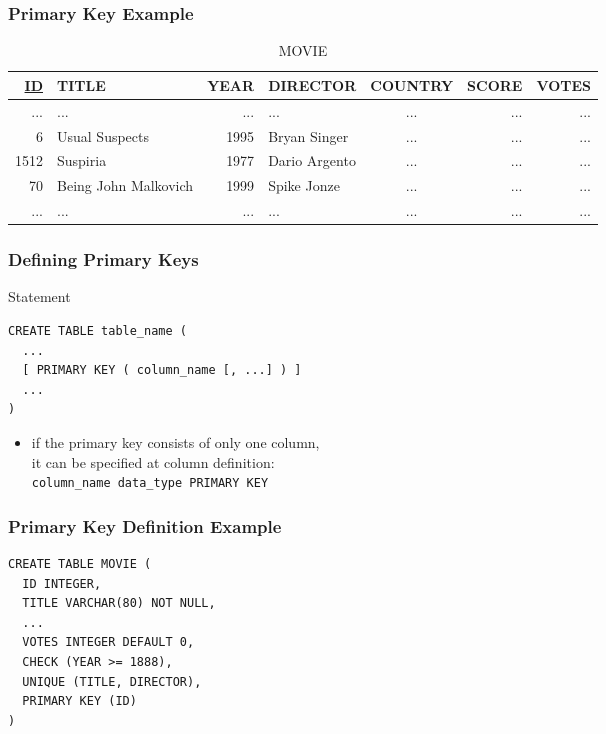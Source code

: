 \documentclass[dvipsnames]{beamer}
\theoremstyle{plain}
\begin{document}
\begin{frame}
  \frametitle{Primary Key Example}

  \begin{example}
    \begin{tiny}
    \begin{table}
      \caption{MOVIE}
      \begin{tabular}{|r|l|r|l|c|r|r|}\hline
\underline{ID} & TITLE      & YEAR & DIRECTOR      & COUNTRY & SCORE & VOTES\\\hline\hline
 ... & ...                  &  ... & ...           & ...     &   ... &   ...\\\hline
   6 & Usual Suspects       & 1995 & Bryan Singer  & ...     &   ... &   ...\\\hline
1512 & Suspiria             & 1977 & Dario Argento & ...     &   ... &   ...\\\hline
  70 & Being John Malkovich & 1999 & Spike Jonze   & ...     &   ... &   ...\\\hline
 ... & ...                  &  ... & ...           & ...     &   ... &   ...\\\hline
      \end{tabular}
    \end{table}
    \end{tiny}
  \end{example}
\end{frame}

\begin{frame}[fragile]
  \frametitle{Defining Primary Keys}

  \begin{block}{Statement}
    \begin{lstlisting}
CREATE TABLE table_name (
  ...
  [ PRIMARY KEY ( column_name [, ...] ) ]
  ...
)
    \end{lstlisting}
  \end{block}

  \begin{itemize}
    \item if the primary key consists of only one column,\\
      it can be specified at column definition:\\
      \lstinline!column_name data_type PRIMARY KEY!
  \end{itemize}
\end{frame}

\begin{frame}[fragile]
  \frametitle{Primary Key Definition Example}

  \begin{example}
    \begin{lstlisting}
CREATE TABLE MOVIE (
  ID INTEGER,
  TITLE VARCHAR(80) NOT NULL,
  ...
  VOTES INTEGER DEFAULT 0,
  CHECK (YEAR >= 1888),
  UNIQUE (TITLE, DIRECTOR),
  PRIMARY KEY (ID)
)
    \end{lstlisting}
  \end{example}
\end{frame}
\end{document}
